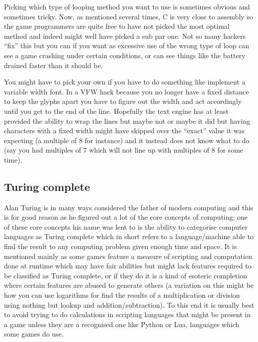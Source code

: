 \documentclass[
]{book}
\begin{document}
Picking which type of looping method you want to use is sometimes obvious and sometimes tricky. Now, as mentioned several times, C is very close to assembly so the game programmers are quite free to have not picked the most optimal method and indeed might well have picked a sub par one. Not so many hackers ``fix'' this but you can if you want as excessive use of the wrong type of loop can see a game crashing under certain conditions, or can see things like the battery drained faster than it should be.

You might have to pick your own if you have to do something like implement a variable width font. In a VFW hack because you no longer have a fixed distance to keep the glyphs apart you have to figure out the width and act accordingly until you get to the end of the line. Hopefully the text engine has at least provided the ability to wrap the lines but maybe not or maybe it did but having characters with a fixed width might have skipped over the ``exact'' value it was expecting (a multiple of 8 for instance) and it instead does not know what to do (say you had multiples of 7 which will not line up with multiples of 8 for some time).

\hypertarget{turing-complete}{%
\subsection{Turing complete}\label{turing-complete}}

Alan Turing is in many ways considered the father of modern computing and this is for good reason as he figured out a lot of the core concepts of computing; one of these core concepts his name was lent to is the ability to categorise computer languages as Turing complete which in short refers to a language/machine able to find the result to any computing problem given enough time and space. It is mentioned mainly as some games feature a measure of scripting and computation done at runtime which may have fair abilities but might lack features required to be classified as Turing complete, or if they do it is a kind of esoteric completion where certain features are abused to generate others (a variation on this might be how you can use logarithms for find the results of a multiplication or division using nothing but lookup and addition/subtraction). To this end it is usually best to avoid trying to do calculations in scripting languages that might be present in a game unless they are a recognised one like Python or Lua, languages which some games do use.
\end{document}
